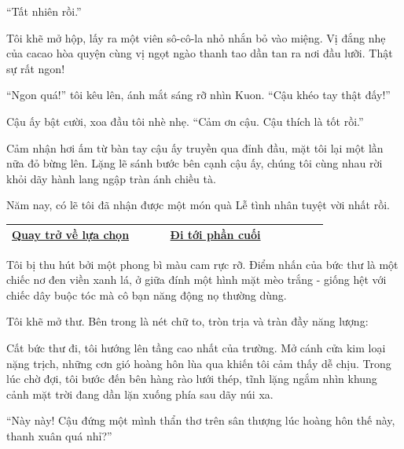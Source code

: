 \documentclass[../main.tex]{subfiles}
\begin{document}
``Tất nhiên rồi.''

Tôi khẽ mở hộp, lấy ra một viên sô-cô-la nhỏ nhắn bỏ vào miệng. Vị đắng nhẹ của cacao hòa quyện cùng vị ngọt ngào thanh tao dần tan ra nơi đầu lưỡi. Thật sự rất ngon!

``Ngon quá!'' tôi kêu lên, ánh mắt sáng rỡ nhìn Kuon. ``Cậu khéo tay thật đấy!''

Cậu ấy bật cười, xoa đầu tôi nhè nhẹ. ``Cảm ơn cậu. Cậu thích là tốt rồi.''

Cảm nhận hơi ấm từ bàn tay cậu ấy truyền qua đỉnh đầu, mặt tôi lại một lần nữa đỏ bừng lên. Lặng lẽ sánh bước bên cạnh cậu ấy, chúng tôi cùng nhau rời khỏi dãy hành lang ngập tràn ánh chiều tà.

Năm nay, có lẽ tôi đã nhận được một món quà Lễ tình nhân tuyệt vời nhất rồi.

\begin{table}[H]
  \centering
  \setlength{\arrayrulewidth}{1pt}
  \begin{tabular}{|>{\centering\arraybackslash}p{0.4\linewidth}|>{\centering\arraybackslash}p{0.4\linewidth}|}
    \hline
    \hyperref[choice]{Quay trở về lựa chọn} & \hyperref[ending]{Đi tới phần cuối} \\ \hline
  \end{tabular}
\end{table}

\newpage
\label{hanabi}

Tôi bị thu hút bởi một phong bì màu cam rực rỡ. Điểm nhấn của bức thư là một chiếc nơ đen viền xanh lá, ở giữa đính một hình mặt mèo trắng - giống hệt với chiếc dây buộc tóc mà cô bạn năng động nọ thường dùng.

Tôi khẽ mở thư. Bên trong là nét chữ to, tròn trịa và tràn đầy năng lượng:


Cất bức thư đi, tôi hướng lên tầng cao nhất của trường. Mở cánh cửa kim loại nặng trịch, những cơn gió hoàng hôn lùa qua khiến tôi cảm thấy dễ chịu. Trong lúc chờ đợi, tôi bước đến bên hàng rào lưới thép, tĩnh lặng ngắm nhìn khung cảnh mặt trời đang dần lặn xuống phía sau dãy núi xa.

\ct


``Này này! Cậu đứng một mình thẩn thơ trên sân thượng lúc hoàng hôn thế này, thanh xuân quá nhỉ?''
\end{document}
